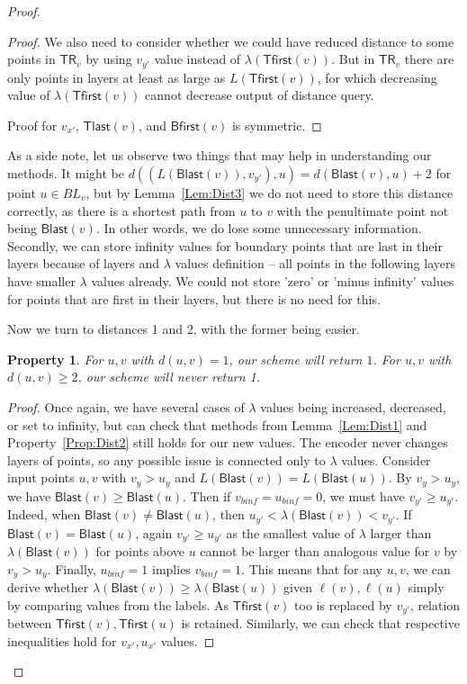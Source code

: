\documentclass[a4paper,11pt]{article}
\newcommand{\lam}{\lambda}
\newcommand{\TR}{\mathsf{TR}}
\newcommand{\Blast}{\mathsf{Blast}}
\newcommand{\Bfirst}{\mathsf{Bfirst}}
\newcommand{\Tlast}{\mathsf{Tlast}}
\newcommand{\Tfirst}{\mathsf{Tfirst}}
\newtheorem{property}[theorem]{Property}
\begin{document}
\begin{proof}
\begin{proof}
We also need to consider whether we could have reduced distance to some points in $\TR_v$
by using $v_{y'}$ value instead of $\lam(\Tfirst(v))$.
But in $\TR_v$ there are only points in layers at least as large as $L(\Tfirst(v))$,
for which decreasing value of $\lam(\Tfirst(v))$ cannot decrease output of distance query.

Proof for $v_{x'}$, $\Tlast(v)$, and $\Bfirst(v)$ is symmetric.
\end{proof}

As a side note, let us observe two things that may help in understanding our methods.
It might be $d((L(\Blast(v)),v_{y'}), u) = d(\Blast(v), u)+2$ for point $u \in BL_{v}$,
but by Lemma~\ref{Lem:Dist3} we do not need to store this distance correctly, as there is a shortest path from $u$
to $v$ with the penultimate point not being $\Blast(v)$.
In other words, we do lose some unnecessary information.
Secondly, we can store infinity values for boundary points that are last in their layers because of
layers and $\lam$ values definition -- all points in the following layers have smaller $\lam$ values already.
We could not store 'zero' or 'minus infinity' values for points that are first in their layers,
but there is no need for this.

Now we turn to distances 1 and 2, with the former being easier.

\begin{property}
For $u,v$ with $d(u,v) = 1$, our scheme will return $1$.
For $u,v$ with $d(u,v) \geq 2$, our scheme will never return 1.
\label{Prop:Dec1}
\end{property}
\begin{proof}

Once again, we have several cases of $\lam$ values being increased, decreased, or set to infinity, but can check that
methods from Lemma~\ref{Lem:Dist1} and Property~\ref{Prop:Dist2} still holds for our new values.
The encoder never changes layers of points, so any possible issue is connected only to $\lam$ values.
Consider input points $u,v$ with $v_y > u_y$ and $L(\Blast(v))=L(\Blast(u))$.
By $v_y > u_y$, we have $\Blast(v) \geq \Blast(u)$.
Then if $v_{binf}=u_{binf}=0$, we must have $v_{y'} \geq u_{y'}$.
Indeed, when $\Blast(v) \neq \Blast(u)$, then $u_{y'} < \lam(\Blast(v))<v_{y'}$.
If $\Blast(v) = \Blast(u)$, again $v_{y'} \geq u_{y'}$ as the smallest value of $\lam$ larger than $\lam(\Blast(v))$
for points above $u$ cannot be larger than analogous value for $v$ by $v_y > u_y$.
Finally, $u_{binf}=1$ implies $v_{binf}=1$.
This means that for any $u,v$, we can derive whether $\lam(\Blast(v)) \geq \lam(\Blast(u))$ given $\ell(v),\ell(u)$
simply by comparing values from the labels.
As $\Tfirst(v)$ too is replaced by $v_{y'}$, relation between $\Tfirst(v),\Tfirst(u)$ is retained.
Similarly, we can check that respective inequalities hold for $v_{x'}, u_{x'}$ values.


\end{proof}
\end{proof}
\end{document}
